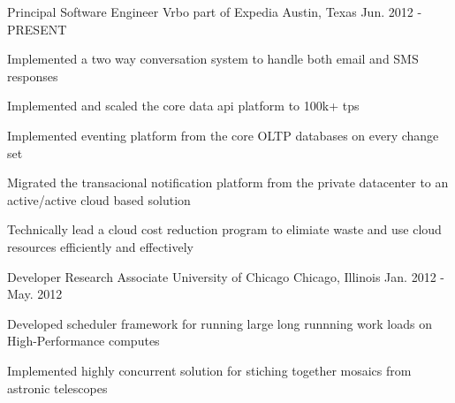


\begin{cventries}


\cventry
{Principal Software Engineer} %
{Vrbo part of Expedia} %
{Austin, Texas} %
{Jun. 2012 - PRESENT} %
{ %
\begin{cvitems}
\item {Implemented a two way conversation system to handle both email and SMS responses}
\item {Implemented and scaled the core data api platform to 100k+ tps}
\item {Implemented eventing platform from the core OLTP databases on every change set}
\item {Migrated the transacional notification platform from the private datacenter to an active/active cloud based solution}
\item {Technically lead a cloud cost reduction program to elimiate waste and use cloud resources efficiently and effectively}
\end{cvitems}
}


\cventry
{Developer Research Associate} %
{University of Chicago} %
{Chicago, Illinois} %
{Jan. 2012 - May. 2012} %
{ %
\begin{cvitems}
\item {Developed scheduler framework for running large long runnning work loads on High-Performance computes}
\item {Implemented highly concurrent solution for stiching together mosaics from astronic telescopes}
\end{cvitems}
}



\end{cventries}
